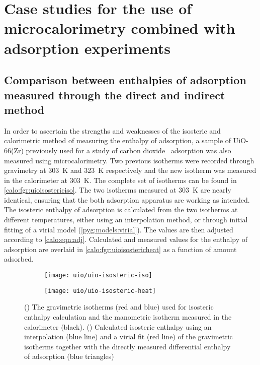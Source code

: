 
\section{Case studies for the use of 
microcalorimetry combined with adsorption experiments}

\subsection{Comparison between enthalpies of adsorption measured
	through the direct and indirect method}

In order to ascertain the strengths and weaknesses of the isosteric 
and calorimetric method of measuring the enthalpy of adsorption, 
a sample of UiO-66(Zr) previously used for a study of 
carbon dioxide~\cite{wiersumEvaluationUiO66GasBased2011} adsorption
was also measured using microcalorimetry.
Two previous isotherms were recorded through gravimetry at \SI{303}{\kelvin} and
\SI{323}{\kelvin} respectively and the new isotherm was measured in the 
calorimeter at \SI{303}{\kelvin}. The complete set of isotherms can
be found in \autoref{calo:fgr:uioisostericiso}.
The two isotherms measured at \SI{303}{\kelvin} are nearly identical, 
ensuring that the both adsorption apparatus are working as intended.
The isosteric enthalpy of adsorption is calculated from the two isotherms
at different temperatures, either using an interpolation method, or through
initial fitting of a virial model (\autoref{pyg:models:virial}).
The values are then adjusted according to \autoref{calo:eqn:adj}.
Calculated and measured values for the enthalpy of adsorption are overlaid
in \autoref{calo:fgr:uioisostericheat} as a function of amount adsorbed.

\begin{figure}[htb]
	\centering

	\begin{subfigure}[b]{.5\textwidth}
		\centering
		\texttt{[image: uio/uio-isosteric-iso]}
		\caption{}%
		\label{calo:fgr:uioisostericiso}
	\end{subfigure}%
	\begin{subfigure}[b]{.5\textwidth}
		\centering
		\texttt{[image: uio/uio-isosteric-heat]}
		\caption{}%
		\label{calo:fgr:uioisostericheat}
	\end{subfigure}
	\caption{(\protect{})
		The gravimetric isotherms (red and blue) used for isosteric enthalpy
		calculation and the manometric isotherm measured in the calorimeter (black).
		(\protect{}) Calculated
		isosteric enthalpy using an interpolation (blue line) and a
		virial fit (red line) of the gravimetric isotherms together with
		the directly measured differential enthalpy of adsorption (blue triangles)}%
	\label{calo:fgr:uioisosteric}

\end{figure}

